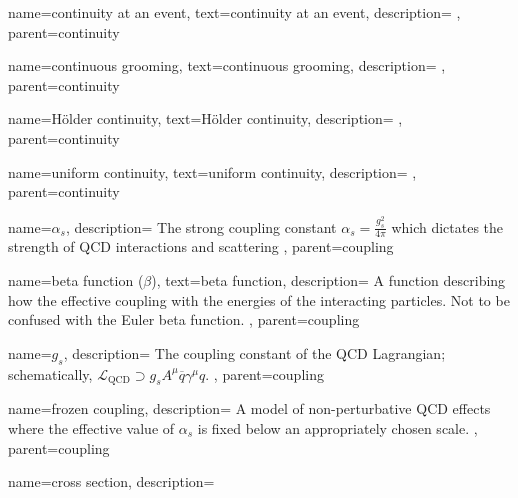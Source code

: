    {
        name=continuity at an event,
        text=continuity at an event,
        description={
        },
        parent=continuity
    }

    {
        name=continuous grooming,
        text=continuous grooming,
        description={
        },
        parent=continuity
    }


    {
        name=H\"older continuity,
        text=H\"older continuity,
        description={
        },
        parent=continuity
    }


    {
        name=uniform continuity,
        text=uniform continuity,
        description={
        },
        parent=continuity
    }



    {
      name=\ensuremath{\alpha_s},
      description={
          The strong coupling constant \(\alpha_s = \frac{g_s^2}{4\pi}\) which dictates the strength of QCD interactions and scattering
    },
    parent=coupling
    }

    {
        name=beta function (\ensuremath{\beta}),
        text=beta function,
        description={%
            A function describing how the effective coupling with the energies of the interacting particles.
            Not to be confused with the Euler beta function.
        },
        parent=coupling
    }

    {
      name=\ensuremath{g_s},
      description={
          The coupling constant of the QCD Lagrangian;
          schematically, \(\mathcal{L}_\text{QCD} \supset g_s A^\mu \overline{q} \gamma^\mu q\).
      },
      parent=coupling
    }


    {
      name=frozen coupling,
      description={
          A model of non-perturbative QCD effects where the effective value of \(\alpha_s\) is fixed below an appropriately chosen scale.
      },
      parent=coupling
    }




{
    name=cross section,
    description={
    }
}


